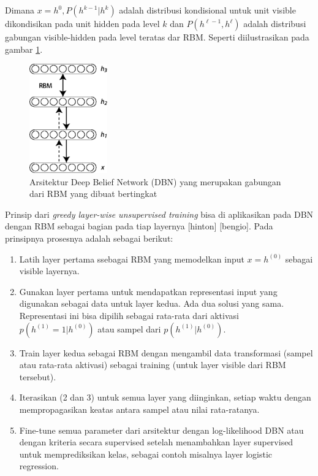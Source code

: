 Dimana $x=h^0, P(h^{k-1} | h^k)$ adalah distribusi kondisional untuk unit visible dikondisikan pada unit hidden pada level $k$ dan  $P(h^{\ell-1}, h^{\ell})$ adalah distribusi gabungan visible-hidden pada level teratas dar RBM. Seperti diilustrasikan pada gambar \ref{fig:dbn3}.

\begin{figure}
	\centering
	\includegraphics[width=0.3\textwidth]
		{pics/DBN3.png}
	\caption{Arsitektur Deep Belief Network (DBN) yang merupakan gabungan dari RBM yang dibuat bertingkat}
	\label{fig:dbn3}
\end{figure}


Prinsip dari \textit{greedy layer-wise unsupervised training} bisa di aplikasikan pada DBN dengan RBM sebagai bagian pada tiap layernya [hinton] [bengio]. Pada prinsipnya prosesnya adalah sebagai berikut:
\begin{enumerate}
\item Latih layer pertama ssebagai RBM yang memodelkan input $x = h^{(0)}$ sebagai visible layernya.
\item Gunakan layer pertama untuk mendapatkan representasi input yang digunakan sebagai data untuk layer kedua. Ada dua solusi yang sama. Representasi ini bisa dipilih sebagai rata-rata dari aktivasi $p(h^{(1)}=1|h^{(0)})$ atau sampel dari $p(h^{(1)}|h^{(0)})$.
\item Train layer kedua sebagai RBM dengan mengambil data transformasi (sampel atau rata-rata aktivasi) sebagai training (untuk layer visible dari RBM tersebut).
\item Iterasikan (2 dan 3) untuk semua layer yang diinginkan, setiap waktu dengan mempropagasikan keatas antara sampel atau nilai rata-ratanya.
\item Fine-tune semua parameter dari arsitektur dengan log-likelihood DBN atau dengan kriteria secara supervised setelah menambahkan layer supervised untuk memprediksikan kelas, sebagai contoh misalnya layer logistic regression.
\end{enumerate}

